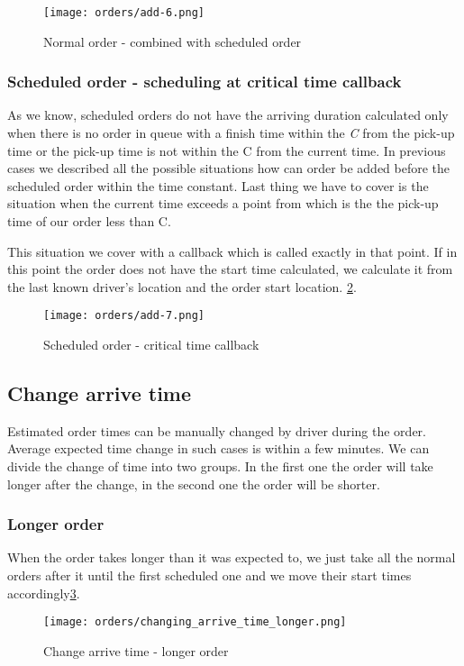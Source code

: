 	\begin{figure}[h]\centering
		\texttt{[image: orders/add-6.png]}
		\caption{Normal order - combined with scheduled order} 
		\label{order-process-normal-order-combined-with-scheduled}
	\end{figure} 

	\subsubsection{Scheduled order - scheduling at critical time callback}
	As we know, scheduled orders do not have the arriving duration calculated only when there is no order in queue with a finish time within the \textit{C} from the pick-up time or the pick-up time is not within the C from the current time. In previous cases we described all the possible situations how can order be added before the scheduled order within the time constant. Last thing we have to cover is the situation when the current time exceeds a point from which is the the pick-up time of our order less than C.
	
	This situation we cover with a callback which is called exactly in that point. If in this point the order does not have the start time calculated, we calculate it from the last known driver's location and the order start location. 
	 \ref{order-process-scheduled-critical-time}.

	\begin{figure}[h]\centering
		\texttt{[image: orders/add-7.png]}
		\caption{Scheduled order - critical time callback} 
		\label{order-process-scheduled-critical-time}
	\end{figure} 

\subsection{Change arrive time}
	Estimated order times can be manually changed by driver during the order. Average expected time change in such cases is within a few minutes. We can divide the change of time into two groups. In the first one the order will take longer after the change, in the second one the order will be shorter.
	
	\subsubsection{Longer order}
	When the order takes longer than it was expected to, we just take all the normal orders after it until the first scheduled one and we move their start times accordingly\ref{order-process-change_longer}.
	\begin{figure}[h]\centering
		\texttt{[image: orders/changing\_arrive\_time\_longer.png]}
		\caption{Change arrive time - longer order} 
		\label{order-process-change_longer}
	\end{figure} 

